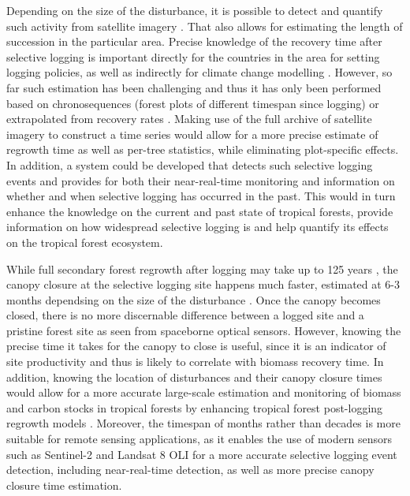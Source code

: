 \documentclass[a4paper,10pt]{article}
\begin{document}
Depending on the size of the disturbance, it is possible to detect and quantify such activity from satellite imagery \citep{shimizu_using_2017, frolking_forest_2009, broadbent_recovery_2006, keller_4._2004}. That also allows for estimating the length of succession in the particular area. Precise knowledge of the recovery time after selective logging is important directly for the countries in the area for setting logging policies, as well as indirectly for climate change modelling \citep{rutishauser_rapid_2015}. However, so far such estimation has been challenging \citep{piponiot_carbon_2016} and thus it has only been performed based on chronosequences (forest plots of different timespan since logging) \citep{broadbent_recovery_2006} or extrapolated from recovery rates \citep{rutishauser_rapid_2015}. Making use of the full archive of satellite imagery to construct a time series would allow for a more precise estimate of regrowth time as well as per-tree statistics, while eliminating plot-specific effects. In addition, a system could be developed that detects such selective logging events and provides for both their near-real-time monitoring and information on whether and when selective logging has occurred in the past. This would in turn enhance the knowledge on the current and past state of tropical forests, provide information on how widespread selective logging is and help quantify its effects on the tropical forest ecosystem.

While full secondary forest regrowth after logging may take up to 125 years \citep{rutishauser_tree_2016}, the canopy closure at the selective logging site happens much faster, estimated at 6-3 months dependsing on the size of the disturbance \citep{broadbent_recovery_2006}. Once the canopy becomes closed, there is no more discernable difference between a logged site and a pristine forest site as seen from spaceborne optical sensors. However, knowing the precise time it takes for the canopy to close is useful, since it is an indicator of site productivity and thus is likely to correlate with biomass recovery time. In addition, knowing the location of disturbances and their canopy closure times would allow for a more accurate large-scale estimation and monitoring of biomass and carbon stocks in tropical forests by enhancing tropical forest post-logging regrowth models \citep{herault_growth_2010}. Moreover, the timespan of months rather than decades is more suitable for remote sensing applications, as it enables the use of modern sensors such as Sentinel-2 and Landsat 8 \ac{OLI} for a more accurate selective logging event detection, including near-real-time detection, as well as more precise canopy closure time estimation.
\end{document}
